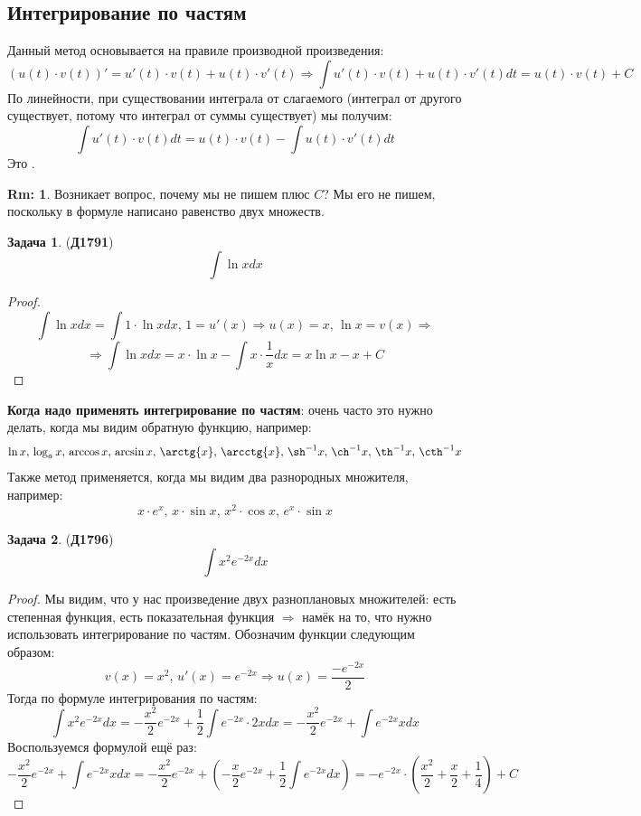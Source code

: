 \documentclass[12pt]{article}
\theoremstyle{definition}
\newtheorem{rem}{Rm:}
\newtheorem{problem}{Задача}
\DeclareMathOperator{\dint}{\displaystyle\int}
\begin{document}
\subsection*{Интегрирование по частям}
Данный метод основывается на правиле производной произведения:
$$
	(u(t){\cdot}v(t))' = u'(t){\cdot}v(t) + u(t){\cdot}v'(t) \Rightarrow \dint u'(t){\cdot}v(t) + u(t){\cdot}v'(t) dt = u(t){\cdot}v(t) + C
$$
По линейности, при существовании интеграла от слагаемого (интеграл от другого существует, потому что интеграл от суммы существует) мы получим:
$$
	\dint u'(t){\cdot}v(t) dt = u(t){\cdot}v(t) - \dint u(t){\cdot}v'(t) dt
$$
Это \textbf{}. 
\begin{rem}
	Возникает вопрос, почему мы не пишем плюс $C$? Мы его не пишем, поскольку в формуле написано равенство двух множеств.
\end{rem}
 \begin{problem}(\textbf{Д1791})
 	$$
 		\dint \ln{x} dx
 	$$
 \end{problem}
\begin{proof}
	$$
		\dint \ln{x} dx =  \dint 1{\cdot}\ln{x} dx, \, 1 = u'(x) \Rightarrow u(x) = x, \, \ln{x} = v(x) \Rightarrow 
	$$
	$$
		\Rightarrow \dint \ln{x} dx = x{\cdot}\ln{x} - \dint x{\cdot}\dfrac{1}{x}dx = x\ln{x} - x + C
	$$
\end{proof}
\textbf{Когда надо применять интегрирование по частям}: очень часто это нужно делать, когда мы видим обратную функцию, например:
$$
	\ln{x}, \, \log_a{x}, \, \arccos{x}, \, \arcsin{x}, \, \arctg{x}, \, \arcctg{x}, \, \sh^{-1}{x}, \, \ch^{-1}{x}, \, \th^{-1}{x}, \, \cth^{-1}{x}
$$
Также метод применяется, когда мы видим два разнородных множителя, например:
$$
	x{\cdot}e^x, \, x{\cdot}\sin{x}, \, x^2{\cdot}\cos{x}, \, e^{x}{\cdot}\sin{x}
$$
\newpage
\begin{problem}(\textbf{Д1796})
	$$
		\dint x^2 e^{-2x}dx
	$$
\end{problem}
\begin{proof}
	Мы видим, что у нас произведение двух разноплановых множителей: есть степенная функция, есть показательная функция $\Rightarrow$ намёк на то, что нужно использовать интегрирование по частям. Обозначим функции следующим образом:
	$$
		v(x) = x^2, \, u'(x) = e^{-2x} \Rightarrow u(x) = \dfrac{-e^{-2x}}{2}
	$$
	Тогда по формуле интегрирования по частям:
	$$
		\dint x^2 e^{-2x}dx = -\dfrac{x^2}{2}e^{-2x} + \dfrac{1}{2}\dint e^{-2x}{\cdot}2x dx = -\dfrac{x^2}{2}e^{-2x} + \dint e^{-2x}x dx
	$$
	Воспользуемся формулой ещё раз:
	$$
		-\dfrac{x^2}{2}e^{-2x} + \dint e^{-2x}x dx = -\dfrac{x^2}{2}e^{-2x} + \left(-\dfrac{x}{2}e^{-2x} + \dfrac{1}{2}\dint e^{-2x}dx\right) = -e^{-2x}{\cdot}\left(\dfrac{x^2}{2} + \dfrac{x}{2} + \dfrac{1}{4}\right) + C
	$$
\end{proof}
\end{document}
